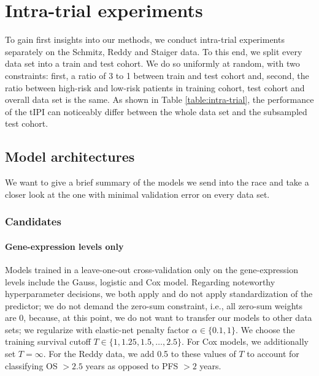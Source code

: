 \section{Intra-trial experiments}\label{sec:intra-trial}

To gain first insights into our methods, we conduct intra-trial experiments separately on the 
Schmitz, Reddy and Staiger data. To this end, we split every data set into a train and test 
cohort. We do so uniformly at random, with two constraints: first, a ratio of 3 to 1 between train 
and test cohort and, second, the ratio between high-risk and low-risk patients in training cohort, 
test cohort and overall data set is the same. As shown in Table \ref{table:intra-trial}, the 
performance of the tIPI can noticeably differ between the whole data set and the subsampled test cohort. 



\subsection{Model architectures}

We want to give a brief summary of the models we send into the race and take a closer look at the 
one with minimal validation error on every data set.

\subsubsection{Candidates}

\paragraph{Gene-expression levels only}
Models trained in a leave-one-out cross-validation only on the gene-expression levels include the 
Gauss, logistic and Cox model. Regarding noteworthy hyperparameter decisions, we both apply and 
do not apply standardization of the predictor; we do not demand the zero-sum constraint, i.e., all 
zero-sum weights are \num{0},
because, at this point, we do not want to transfer our models to other data sets;
we regularize with elastic-net penalty factor $\alpha \in \{ \num{0.1}, 1 \}$. We choose the 
training survival cutoff $T \in \{ 1, \num{1.25}, \num{1.5}, \ldots, \num{2.5}\}$. For Cox models, 
we additionally set $T = \infty$. For the Reddy data, we add \num{0.5} to these values of $T$ to 
account for classifying OS $> \num{2.5}$ years as opposed to PFS $> \num{2}$ years.

